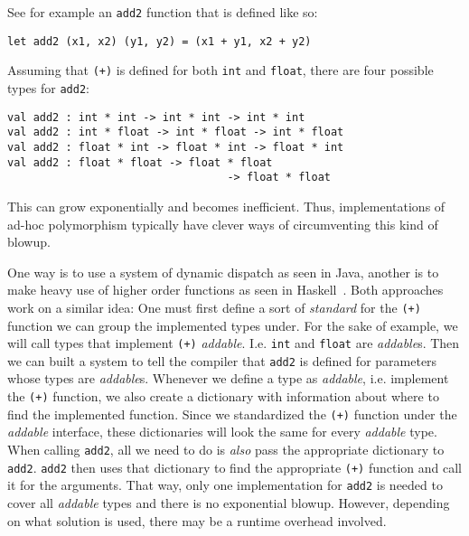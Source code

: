 See for example an \verb|add2| function that is defined like so:
\begin{verbatim}
let add2 (x1, x2) (y1, y2) = (x1 + y1, x2 + y2)
\end{verbatim}
Assuming that \verb|(+)| is defined for both \verb|int| and \verb|float|, there are four possible types for \verb|add2|:
\begin{verbatim}
val add2 : int * int -> int * int -> int * int
val add2 : int * float -> int * float -> int * float
val add2 : float * int -> float * int -> float * int
val add2 : float * float -> float * float
                                  -> float * float
\end{verbatim}
This can grow exponentially and becomes inefficient. Thus, implementations of ad-hoc polymorphism typically have clever ways of circumventing this kind of blowup.

One way is to use a system of dynamic dispatch as seen in Java, another is to make heavy use of higher order functions as seen in Haskell~\cite{type-classes-original}. Both approaches work on a similar idea: One must first define a sort of \textit{standard} for the \verb|(+)| function we can group the implemented types under. For the sake of example, we will call types that implement \verb|(+)| \textit{addable}. I.e. \verb|int| and \verb|float| are \textit{addable}s. Then we can built a system to tell the compiler that \verb|add2| is defined for parameters whose types are \textit{addable}s. Whenever we define a type as \textit{addable}, i.e. implement the \verb|(+)| function, we also create a dictionary with information about where to find the implemented function. Since we standardized the \verb|(+)| function under the \textit{addable} interface, these dictionaries will look the same for every \textit{addable} type. When calling \verb|add2|, all we need to do is \textit{also} pass the appropriate dictionary to \verb|add2|. \verb|add2| then uses that dictionary to find the appropriate \verb|(+)| function and call it for the arguments. That way, only one implementation for \verb|add2| is needed to cover all \textit{addable} types and there is no exponential blowup. However, depending on what solution is used, there may be a runtime overhead involved.
